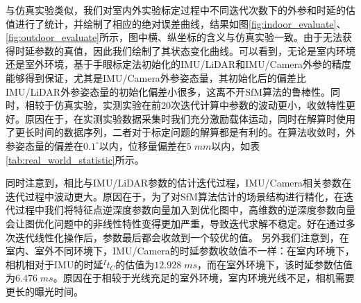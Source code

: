 与仿真实验类似，我们对室内外实验标定过程中不同迭代次数下的外参和时延的估值进行了统计，并绘制了相应的绝对误差曲线，结果如图\ref{fig:indoor_evaluate}、\ref{fig:outdoor_evaluate}所示，图中横、纵坐标的含义与仿真实验一致。由于无法获得时延参数的真值，因此我们绘制了其状态变化曲线。可以看到，无论是室内环境还是室外环境，基于手眼标定法初始化的IMU/LiDAR和IMU/Camera外参的精度能够得到保证，尤其是IMU/Camera外参姿态量，其初始化后的偏差比IMU/LiDAR外参姿态量的初始化偏差小很多，这离不开SfM算法的鲁棒性。同时，相较于仿真实验，实测实验在前20次迭代计算中参数的波动更小，收敛特性更好。原因在于，在实测实验数据采集时我们充分激励载体运动，同时在解算时使用了更长时间的数据序列，二者对于标定问题的解算都是有利的。在算法收敛时，外参姿态量的偏差在$0.1^\circ$以内，位移量偏差在$5\;mm$以内，如表\ref{tab:real_world_statistic}所示。

同时注意到，相比与IMU/LiDAR参数的估计迭代过程，IMU/Camera相关参数在迭代过程中波动更大。原因在于，为了对SfM算法估计的场景结构进行精化，在迭代过程中我们将特征点逆深度参数向量加入到优化图中，高维数的逆深度参数向量会让图优化问题中的非线性特性变得更加严重，导致迭代求解不稳定。好在通过多次迭代线性化操作后，参数最后都会收敛到一个较优的值。
另外我们注意到，在室内、室外不同环境下，IMU/Camera的时延参数收敛值不一样：在室内环境下，相机相对于IMU的时延${^I}t_C$的估值为$12.928\;ms$，而在室外环境下，该时延参数估值为$6.476\;ms$。原因在于相较于光线充足的室外环境，室内环境光线不足，相机需要更长的曝光时间。

